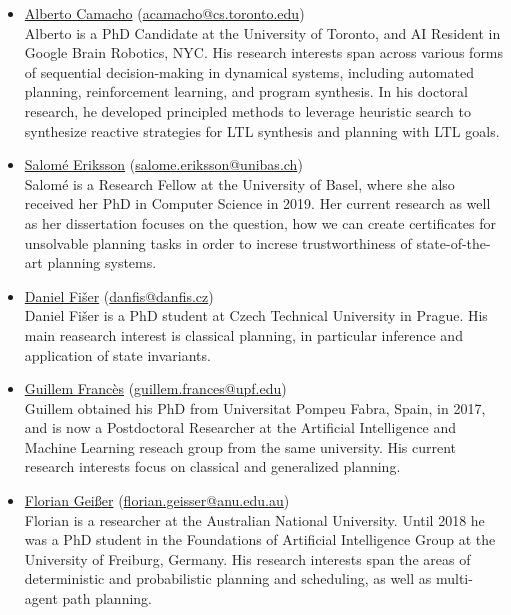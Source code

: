 \documentclass[10pt]{article}
\begin{document}
\begin{itemize}

\item \href{http://}{Alberto Camacho}
(\href{mailto:acamacho@cs.toronto.edu}{acamacho@cs.toronto.edu})\\
Alberto is a PhD Candidate at the University of Toronto, and AI Resident in
Google Brain Robotics, NYC. His research interests span across various
forms of sequential decision-making in dynamical systems, including
automated planning, reinforcement learning, and program synthesis. In
his doctoral research, he developed principled methods to leverage
heuristic search to synthesize reactive strategies for LTL synthesis and
planning with LTL goals.

\item \href{http://}{Salom\'{e} Eriksson}
(\href{mailto:salome.eriksson@unibas.ch}{salome.eriksson@unibas.ch})\\
Salom\'{e} is a Research Fellow at the University of Basel, where she also received
her PhD in Computer Science in 2019. Her current research as well as her
dissertation focuses on the question, how we can create certificates for
unsolvable planning tasks in order to increse trustworthiness of
state-of-the-art planning systems.

\item \href{http://}{Daniel Fi\v{s}er}
(\href{mailto:danfis@danfis.cz}{danfis@danfis.cz})\\
Daniel Fi\v{s}er is a PhD student at Czech Technical University in Prague.
His main reasearch interest is classical planning, in particular inference and
application of state invariants.

\item \href{https://www.upf.edu/web/ai-ml/entry/-/-/31934/adscripcion/guillem-franc%C3%A8s}{Guillem Franc\`{e}s}
    (\href{mailto:guillem.frances@upf.edu}{guillem.frances@upf.edu})\\
Guillem obtained his PhD from Universitat Pompeu Fabra, Spain, in 2017, and
is now a Postdoctoral Researcher at the Artificial Intelligence and Machine
Learning reseach group from the same university.
His current research interests focus on classical and generalized planning.

\item \href{https://cecs.anu.edu.au/people/florian-geisser}{Florian Gei{\ss}er}
(\href{mailto:florian.geisser@anu.edu.au}{florian.geisser@anu.edu.au})\\
Florian is a researcher at the Australian National University. Until 2018 he was
a PhD student in the Foundations of Artificial Intelligence Group at the
University of Freiburg, Germany. His research interests span the areas of
deterministic and probabilistic planning and scheduling, as well as
multi-agent path planning.


\end{itemize}
\end{document}
